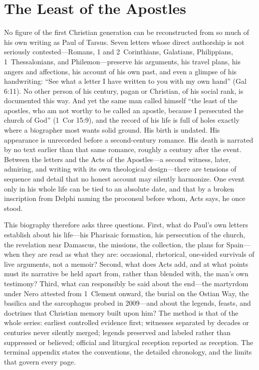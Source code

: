 \section{The Least of the Apostles}

No figure of the first Christian generation can be reconstructed from so much
of his own writing as Paul of Tarsus. Seven letters whose direct authorship
is not seriously contested---Romans, 1 and 2~Corinthians, Galatians,
Philippians, 1~Thessalonians, and Philemon---preserve his arguments, his
travel plans, his angers and affections, his account of his own past, and
even a glimpse of his handwriting: ``See what a letter I have written to you
with my own hand'' (Gal 6:11). No other person of his century, pagan or
Christian, of his social rank, is documented this way. And yet the same man
called himself ``the least of the apostles, who am not worthy to be called
an apostle, because I persecuted the church of God'' (1~Cor 15:9), and the
record of his life is full of holes exactly where a biographer most wants
solid ground. His birth is undated. His appearance is unrecorded before a
second-century romance. His death is narrated by no text earlier than that
same romance, roughly a century after the event. Between the letters and
the Acts of the Apostles---a second witness, later, admiring, and writing
with its own theological design---there are tensions of sequence and detail
that no honest account may silently harmonize. One event only in his whole
life can be tied to an absolute date, and that by a broken inscription from
Delphi naming the proconsul before whom, Acts says, he once stood.

This biography therefore asks three questions. First, what do Paul's own
letters establish about his life---his Pharisaic formation, his persecution
of the church, the revelation near Damascus, the missions, the collection,
the plans for Spain---when they are read as what they are: occasional,
rhetorical, one-sided survivals of live arguments, not a memoir? Second,
what does Acts add, and at what points must its narrative be held apart
from, rather than blended with, the man's own testimony? Third, what can
responsibly be said about the end---the martyrdom under Nero attested from
1~Clement onward, the burial on the Ostian Way, the basilica and the
sarcophagus probed in 2009---and about the legends, feasts, and doctrines
that Christian memory built upon him? The method is that of the whole
series: earliest controlled evidence first; witnesses separated by decades
or centuries never silently merged; legends preserved and labeled rather
than suppressed or believed; official and liturgical reception reported as
reception. The terminal appendix states the conventions, the detailed
chronology, and the limits that govern every page.
